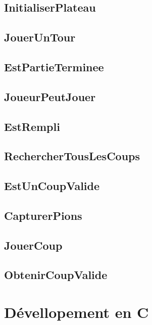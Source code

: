     \subsection{InitialiserPlateau}
      
    \subsection{JouerUnTour}
      
    \subsection{EstPartieTerminee}
      
    \subsection{JoueurPeutJouer}
      
    \subsection{EstRempli}
      
    \subsection{RechercherTousLesCoups}
      
    \subsection{EstUnCoupValide}
      
    \subsection{CapturerPions}
      
    \subsection{JouerCoup}
      
    \subsection{ObtenirCoupValide}
      

  \newpage
  \section{Dévellopement en C}
    

